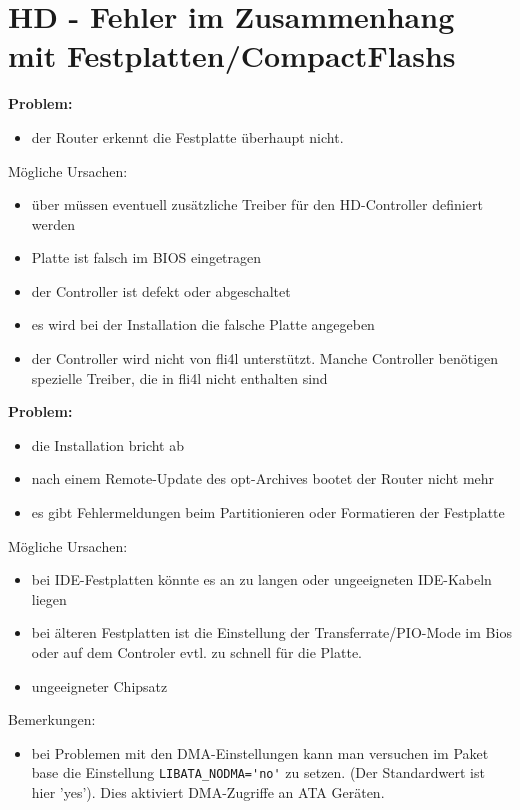 {
  \section{HD - Fehler im Zusammenhang mit Festplatten/CompactFlashs}
}    
    \textbf{Problem:}

    \begin{itemize}
    \item der Router erkennt die Festplatte überhaupt nicht.
    \end{itemize}

    Mögliche Ursachen:

    \begin{itemize}
    \item über  müssen eventuell zusätzliche Treiber 
      für den HD-Controller definiert werden
    \item Platte ist falsch im BIOS eingetragen
    \item der Controller ist defekt oder abgeschaltet
    \item es wird bei der Installation die falsche Platte angegeben
    \item der Controller wird nicht von fli4l unterstützt. Manche
      Controller benötigen spezielle Treiber, die in fli4l 
      nicht enthalten sind
    \end{itemize}

    \textbf{Problem:}
    \begin{itemize}
    \item die Installation bricht ab
    \item nach einem Remote-Update des opt-Archives bootet der Router nicht
      mehr
    \item es gibt Fehlermeldungen beim Partitionieren oder Formatieren
      der Festplatte
    \end{itemize}

    Mögliche Ursachen:
    \begin{itemize}
    \item bei IDE-Festplatten könnte es an zu langen oder
      ungeeigneten IDE-Kabeln liegen
    \item bei älteren Festplatten ist die Einstellung der
      Transferrate/PIO-Mode im Bios oder auf dem Controler evtl. zu
      schnell für die Platte.
    \item ungeeigneter Chipsatz
    \end{itemize}

    Bemerkungen:
    \begin{itemize}
    \item bei Problemen mit den DMA-Einstellungen kann man versuchen im Paket 
      base die Einstellung \verb*?LIBATA_NODMA='no'? zu setzen. (Der Standardwert
      ist hier 'yes'). Dies aktiviert DMA-Zugriffe an ATA Geräten.
    \end{itemize}

